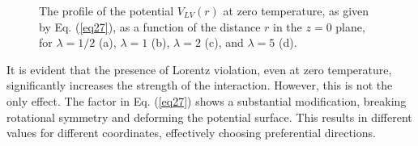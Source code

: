 \documentclass[11pt,showpacs,preprintnumbers,amsmath,amssymb,prd,nofootinbib,superscriptaddress]{revtex4-2}
\begin{document}
\begin{figure}[ht]
    \hfill
    \caption{The profile of the potential $V_{LV}(r)$ at zero temperature, as given by Eq. (\ref{eq27}), as a function of the distance $r$ in the $z=0$ plane, for $\lambda = 1/2$ (a), $\lambda = 1$ (b), $\lambda = 2$ (c), and $\lambda = 5$ (d). }
    \label{fig4}
\end{figure}

It is evident that the presence of Lorentz violation, even at zero temperature, significantly increases the strength of the interaction. However, this is not the only effect. The factor in Eq. (\ref{eq27}) shows a substantial modification, breaking rotational symmetry and deforming the potential surface. This results in different values for different coordinates, effectively choosing preferential directions.
\end{document}
